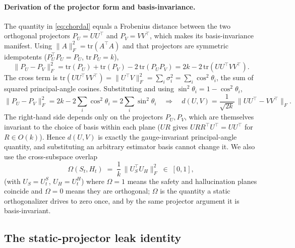 \paragraph{Derivation of the projector form and basis-invariance.} The quantity in
\eqref{eq:chordal} equals a Frobenius distance between the two orthogonal projectors
$P_U = U U^\top$ and $P_V = V V^\top$, which makes its basis-invariance manifest. Using
$\|A\|_F^2 = \mathrm{tr}(A^\top A)$ and that projectors are symmetric idempotents
($P_U^\top P_U = P_U$, $\mathrm{tr}\,P_U = k$),
\begin{equation}
\label{eq:projexpand}
\| P_U - P_V \|_F^2
= \mathrm{tr}(P_U) + \mathrm{tr}(P_V) - 2\,\mathrm{tr}(P_U P_V)
= 2k - 2\,\mathrm{tr}(U U^\top V V^\top).
\end{equation}
The cross term is $\mathrm{tr}(U U^\top V V^\top) = \| U^\top V \|_F^2 = \sum_i \sigma_i^2
= \sum_i \cos^2\theta_i$, the sum of squared principal-angle cosines. Substituting and
using $\sin^2\theta_i = 1 - \cos^2\theta_i$,
\begin{equation}
\label{eq:projid}
\| P_U - P_V \|_F^2 = 2k - 2 \sum_{i} \cos^2\theta_i = 2 \sum_{i} \sin^2\theta_i
\quad\Longrightarrow\quad
d(U, V) = \frac{1}{\sqrt{2k}}\, \| U U^\top - V V^\top \|_F .
\end{equation}
The right-hand side depends only on the projectors $P_U, P_V$, which are themselves
invariant to the choice of basis within each plane ($U R$ gives $U R R^\top U^\top =
U U^\top$ for $R \in O(k)$). Hence $d(U, V)$ is exactly the gauge-invariant principal-angle
quantity, and substituting an arbitrary estimator basis cannot change it. We also use the
cross-subspace overlap
\begin{equation}
\label{eq:omega}
\Omega(S_t, H_t) \;=\; \frac{1}{k}\, \big\| U_S^\top U_H \big\|_F^2 \;\in\; [0, 1],
\end{equation}
(with $U_S = U_t^{S}$, $U_H = U_t^{H}$) where $\Omega = 1$ means the safety and
hallucination planes coincide and $\Omega = 0$ means they are orthogonal; $\Omega$ is the
quantity a static orthogonalizer drives to zero once, and by the same projector argument it
is basis-invariant.

\subsection{The static-projector leak identity}
\label{sec:leak}

